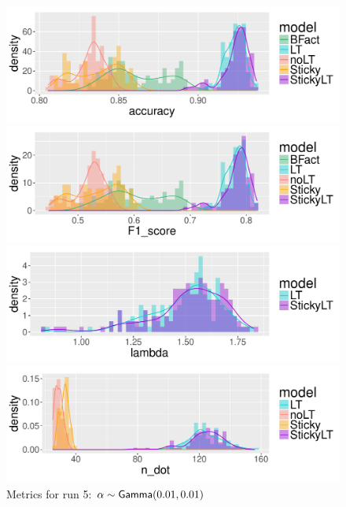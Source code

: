 \begin{figure}[tb]
  \centering
  \begin{minipage}{0.75\textwidth}
  \includegraphics[width = \textwidth]{fig/cocktail/synth_s16_m12/hyper_alpha/h10.0_nocs_cp0/a0p01b0p01/accuracy_density.pdf}
\end{minipage}

\begin{minipage}{0.75\textwidth}
  \includegraphics[width = \textwidth]{fig/cocktail/synth_s16_m12/hyper_alpha/h10.0_nocs_cp0/a0p01b0p01/F1_score_density.pdf}
\end{minipage}

\begin{minipage}{0.75\textwidth}
  \includegraphics[width = \textwidth]{fig/cocktail/synth_s16_m12/hyper_alpha/h10.0_nocs_cp0/a0p01b0p01/lambda_density.pdf}
\end{minipage}

\begin{minipage}{0.75\textwidth}
  \includegraphics[width = \textwidth]{fig/cocktail/synth_s16_m12/hyper_alpha/h10.0_nocs_cp0/a0p01b0p01/n_dot_density.pdf}
\end{minipage}
\caption{Metrics for run 5: $\alpha \sim \mathsf{Gamma}(0.01,0.01)$}
\end{figure}

